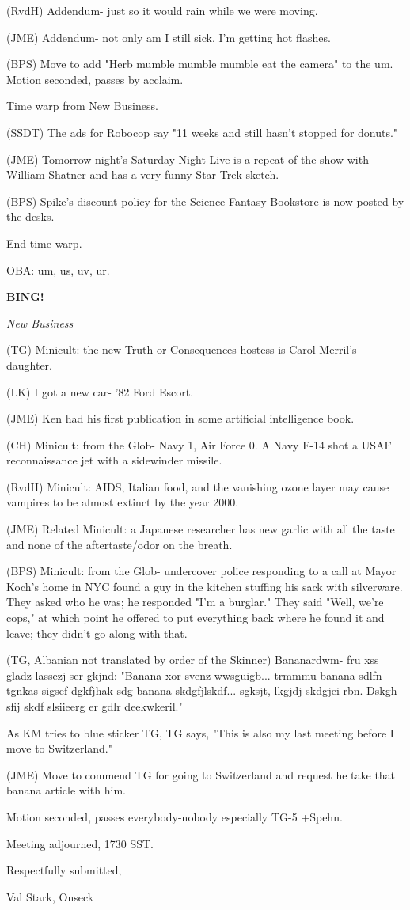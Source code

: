 \documentclass[12pt]{article}
\newcommand{\bing}{{\bf BING!} }
\newcommand{\goto}[1]{\bing \vskip 12pt \centerline{{\em{#1}}}}
\begin{document}
(RvdH) Addendum- just so it would rain while we were moving.

(JME) Addendum- not only am I still sick, I'm getting hot flashes.

(BPS) Move to add "Herb mumble mumble mumble eat the camera" to the um. Motion seconded, passes by acclaim.

Time warp from New Business.

(SSDT) The ads for Robocop say "11 weeks and still hasn't stopped for donuts."

(JME) Tomorrow night's Saturday Night Live is a repeat of the show with William Shatner and has a very funny Star Trek sketch.

(BPS) Spike's discount policy for the Science Fantasy Bookstore is now posted by the desks.

End time warp.

OBA: um, us, uv, ur.

\goto{New Business}

(TG) Minicult: the new Truth or Consequences hostess is Carol Merril's daughter.

(LK) I got a new car- '82 Ford Escort.

(JME) Ken had his first publication in some artificial intelligence book.

(CH) Minicult: from the Glob- Navy 1, Air Force 0. A Navy F-14 shot a USAF reconnaissance jet with a sidewinder missile.

(RvdH) Minicult: AIDS, Italian food, and the vanishing ozone layer may cause vampires to be almost extinct by the year 2000.

(JME) Related Minicult: a Japanese researcher has new garlic with all the taste and none of the aftertaste/odor on the breath.

(BPS) Minicult: from the Glob- undercover police responding to a call at Mayor Koch's home in NYC found a guy in the kitchen stuffing his sack with silverware. They asked who he was; he responded "I'm a burglar." They said "Well, we're cops," at which point he offered to put everything back where he found it and leave; they didn't go along with that.

(TG, Albanian not translated by order of the Skinner) Bananardwm- fru xss gladz lassezj ser gkjnd: "Banana xor svenz wwsguigb... trmmmu banana sdlfn tgnkas sigsef dgkfjhak sdg banana skdgfjlskdf... sgksjt, lkgjdj skdgjei rbn. Dskgh sfij skdf slsiieerg er gdlr deekwkeril."

As KM tries to blue sticker TG, TG says, "This is also my last meeting before I move to Switzerland."

(JME) Move to commend TG for going to Switzerland and request he take that banana article with him.

Motion seconded, passes everybody-nobody especially TG-5 +Spehn.

\vspace{12pt}

\noindent
Meeting adjourned, 1730 SST.

\vspace{18pt}

\centerline{Respectfully submitted,}
\centerline{Val Stark, Onseck}
\end{document}
